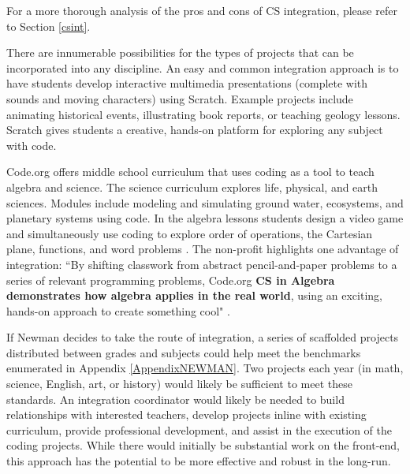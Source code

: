 For a more thorough analysis of the pros and cons of CS integration, please refer to Section \ref{csint}. \par
There are innumerable possibilities for the types of projects that can be incorporated into any discipline. An easy and common integration approach is to have students develop interactive multimedia presentations (complete with sounds and moving characters) using Scratch. Example projects include animating historical events, illustrating book reports, or teaching geology lessons. Scratch gives students a creative, hands-on platform for exploring any subject with code.\par
Code.org offers middle school curriculum that uses coding as a tool to teach algebra and science. The science curriculum explores life, physical, and earth sciences. Modules include modeling and simulating ground water, ecosystems, and planetary systems using code. In the algebra lessons students design a video game and simultaneously use coding to explore order of operations, the Cartesian plane, functions, and word problems \cite{codeorgal}. The non-profit highlights one advantage of integration: ``By shifting classwork from abstract pencil-and-paper problems to a series of relevant programming problems, Code.org \textbf{CS in Algebra demonstrates how algebra applies in the real world}, using an exciting, hands-on approach to create something cool" \cite{codeorgal}.  \par
If Newman decides to take the route of integration, a series of scaffolded projects distributed between grades and subjects could help meet the benchmarks enumerated in Appendix \ref{AppendixNEWMAN}. Two projects each year (in math, science, English, art, or history) would likely be sufficient to meet these standards. An integration coordinator would likely be needed to build relationships with interested teachers, develop projects inline with existing curriculum, provide professional development, and assist in the execution of the coding projects. While there would initially be substantial work on the front-end, this approach has the potential to be more effective and robust in the long-run.  \par


